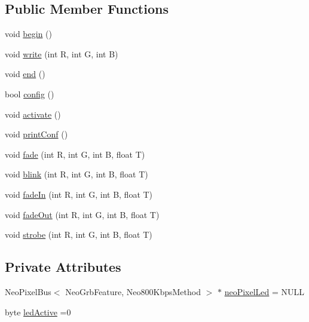 \subsection*{Public Member Functions}
\begin{DoxyCompactItemize}
\item 
void \hyperlink{class_cool_board_led_ae3cbde8affcc6f011cbd698c8ef911f6}{begin} ()
\item 
void \hyperlink{class_cool_board_led_a30fadd4cbec17ceea428bf7a32207e87}{write} (int R, int G, int B)
\item 
void \hyperlink{class_cool_board_led_a69f323359e0c9f797422f2152b5d41ef}{end} ()
\item 
bool \hyperlink{class_cool_board_led_a1b60e5e30bea96c49ed62ed1bf1ffc8b}{config} ()
\item 
void \hyperlink{class_cool_board_led_ae74fe4b47d06c3a97b468ba220c4eb99}{activate} ()
\item 
void \hyperlink{class_cool_board_led_a8ed3053a36f0ed4a131f43b5b17efb61}{print\+Conf} ()
\item 
void \hyperlink{class_cool_board_led_af1cacbaa88db8bcf6042c1083ba41155}{fade} (int R, int G, int B, float T)
\item 
void \hyperlink{class_cool_board_led_a96e1ea13003eee34c9dbcef340404426}{blink} (int R, int G, int B, float T)
\item 
void \hyperlink{class_cool_board_led_ab778f5e7bed0ab74e3906d82110493c3}{fade\+In} (int R, int G, int B, float T)
\item 
void \hyperlink{class_cool_board_led_a93d545679237e8cc858324367149775c}{fade\+Out} (int R, int G, int B, float T)
\item 
void \hyperlink{class_cool_board_led_ad5f0de4c628cbfbf49896042831c64ad}{strobe} (int R, int G, int B, float T)
\end{DoxyCompactItemize}
\subsection*{Private Attributes}
\begin{DoxyCompactItemize}
\item 
Neo\+Pixel\+Bus$<$ Neo\+Grb\+Feature, Neo800\+Kbps\+Method $>$ $\ast$ \hyperlink{class_cool_board_led_ac2c13fa462a010cd9242bf297c013923}{neo\+Pixel\+Led} = N\+U\+LL
\item 
byte \hyperlink{class_cool_board_led_a5f17c135516fcf4b44ea8a096ba0177a}{led\+Active} =0
\end{DoxyCompactItemize}



